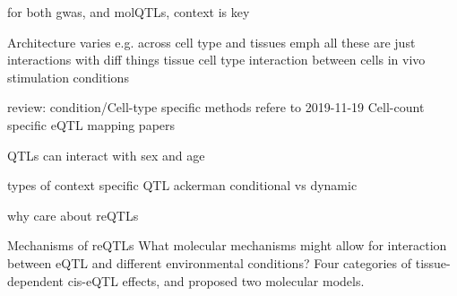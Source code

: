 \begin{outline}
    \2 for both gwas, and molQTLs, context is key

\1 Architecture varies e.g. across cell type and tissues
\1 emph all these are just interactions with diff things
    \2 tissue
    \2 cell type
    \2 interaction between cells in vivo
    \2 stimulation conditions

review: condition/Cell-type specific methods
    refere to 2019-11-19 Cell-count specific eQTL mapping papers

\1 QTLs can interact with sex and age

\1 types of context specific QTL
    \2 ackerman conditional vs dynamic

\1 why care about reQTLs



\1 Mechanisms of reQTLs
What molecular mechanisms might allow for interaction between \Gls{eQTL} and different environmental conditions?
Four categories of tissue-dependent cis-eQTL effects, and proposed two molecular models.



\end{outline}
